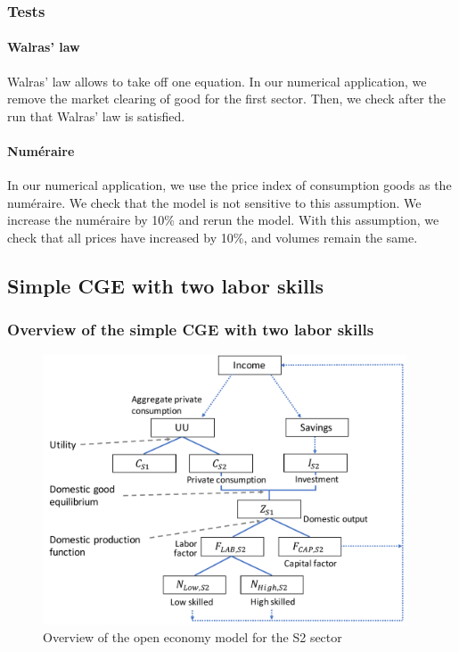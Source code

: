 \subsubsection{Tests}

\paragraph{Walras' law}
Walras' law allows to take off one equation. 
In our numerical application, we remove the market clearing of good for the first sector.
Then, we check after the run that Walras' law is satisfied.

\paragraph{Numéraire}
In our numerical application, we use the price index of consumption goods as the numéraire. 
We check that the model is not sensitive to this assumption. We increase the numéraire by 10\% and rerun the model.
With this assumption, we check that all prices have increased by 10\%, and volumes remain the same.


\clearpage

\subsection{Simple CGE with two labor skills}
\label{app:two_labour_model}

\subsubsection{Overview of the simple CGE with two labor skills}
\begin{figure}[!ht]
	\centering
	\includegraphics[height=8cm]{figures/overview_twoLabors.pdf}
	\caption{Overview of the open economy model for the S2 sector}
	\label{fig:overview_twoLabors}
\end{figure}

